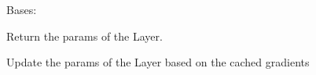 \documentclass[letterpaper,10pt,english]{sphinxmanual}
\begin{document}
\begin{fulllineitems}
\label{\detokenize{nn:nn.linear.Layer}}
Bases: {\hyperref[\detokenize{nn:nn.module.Module}]{}}

\begin{fulllineitems}
\label{\detokenize{nn:nn.linear.Layer.param}}
Return the params of the Layer.

\end{fulllineitems}


\begin{fulllineitems}
\label{\detokenize{nn:nn.linear.Layer.update_param}}
Update the params of the Layer based on the cached gradients

\end{fulllineitems}


\end{fulllineitems}

\end{document}
